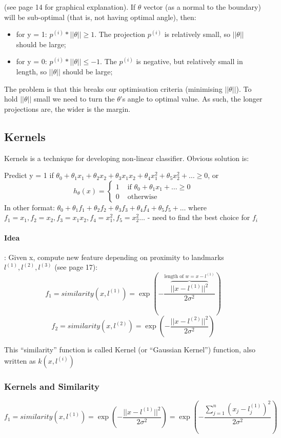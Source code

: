 \documentclass{scrartcl}
\begin{document}
(see page 14 for graphical explanation). If $\theta$ vector (as a
normal to the boundary) will be sub-optimal (that is, not having
optimal angle), then:
\begin{itemize}
\item for y = 1: $p^{(i)} * ||\theta|| \geq 1$. The projection
  $p^{(i)}$ is relatively small, so $||\theta||$ should be large;
\item for y = 0: $p^{(i)} * ||\theta|| \leq -1$. The $p^{(i)}$ is
  negative, but relatively small in length, so $||\theta||$ should be
  large;
\end{itemize}
The problem is that this breaks our optimisation criteria (minimising
$||\theta||$). To hold $||\theta||$ small we need to turn the
$\theta$'s angle to optimal value. As such, the longer projections
are, the wider is the margin.

\subsection{Kernels}
\label{sec:12-4}
Kernels is a technique for developing non-linear classifier. Obvious
solution is:

Predict y = 1 if $\theta_0 + \theta_1x_1 + \theta_2x_2 +
\theta_3x_1x_2 + \theta_4x_1^2 + \theta_5x_2^2 + \dots \geq 0$, or
\[ h_\theta(x) = \left\{
  \begin{array}{ll}
    1 & \textrm{ if } \theta_0 + \theta_1x_1 + \dots \geq 0 \\
    0 & \textrm{ otherwise } 
  \end{array} \right. \]
In other format: $\theta_0 + \theta_1f_1 + \theta_2f_2 +
\theta_3f_3 + \theta_4f_4 + \theta_5f_5 + \dots$ where $f_1 = x_1, f_2
= x_2, f_3 = x_1x_2, f_4 = x_1^2, f_5 = x_2^2 \dots $ - need to find
the best choice for $f_i$

\paragraph{Idea}: Given x, compute new feature depending on proximity
to landmarks $l^{(1)}, l^{(2)}, l^{(3)}$ (see page 17): \[f_1 =
similarity(x, l^{(1)}) = \exp(- \frac{\overbrace{||x -
    l^{(1)}||^2}^{\textrm{length of } w = x - l^{(1)}}
}{2\sigma^2}) \]
\[f_2 = similarity(x, l^{(2)}) = \exp(- \frac{||x -
  l^{(2)}||^2}{2\sigma^2}) \]

This ``similarity'' function is called Kernel (or ``Gaussian Kernel'')
function, also written as $k(x, l^{(i)})$

\subsubsection{Kernels and Similarity}
\[f_1 = similarity(x, l^{(1)}) = \exp(- \frac{||x -
  l^{(1)}||^2}{2\sigma^2}) = \exp (- \frac{\sum \limits_{j=1}^{n} (x_j
  - l_j^{(1)})^2}{2\sigma^2}) \]
\end{document}

